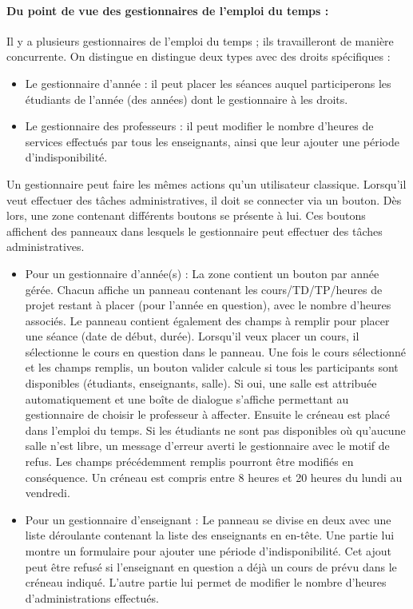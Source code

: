 \documentclass{article}
\begin{document}
\paragraph{Du point de vue des gestionnaires de l'emploi du temps :\\}
Il y a plusieurs gestionnaires de l'emploi du temps ; ils travailleront de manière concurrente. On distingue en distingue deux types avec des droits spécifiques :
\begin{itemize}
\item Le gestionnaire d'année : il peut placer les séances auquel participerons les étudiants de l'année (des années) dont le gestionnaire à les droits.
\item Le gestionnaire des professeurs : il peut modifier le nombre d'heures de services effectués par tous les enseignants, ainsi que leur ajouter une période d'indisponibilité.
\end{itemize}

Un gestionnaire peut faire les mêmes actions qu'un utilisateur classique. Lorsqu'il veut effectuer des tâches administratives, il doit se connecter via un bouton. Dès lors, une zone contenant différents boutons se présente à lui. Ces boutons affichent des panneaux dans lesquels le gestionnaire peut effectuer des tâches administratives.

\begin{itemize}
\item Pour un gestionnaire d'année(s) :
La zone contient un bouton par année gérée. Chacun affiche un panneau contenant les cours/TD/TP/heures de projet restant à placer (pour l'année en question), avec le nombre d'heures associés. Le panneau contient également des champs à remplir pour placer une séance (date de début, durée). Lorsqu'il veux placer un cours, il sélectionne le cours en question dans le panneau. Une fois le cours sélectionné et les champs remplis, un bouton valider calcule si tous les participants sont disponibles (étudiants, enseignants, salle). Si oui, une salle est attribuée automatiquement et une boîte de dialogue s'affiche permettant au gestionnaire de choisir le professeur à affecter. Ensuite le créneau est placé dans l'emploi du temps. Si les étudiants ne sont pas disponibles où qu'aucune salle n'est libre, un message d'erreur averti le gestionnaire avec le motif de refus. Les champs précédemment remplis pourront être modifiés en conséquence.
Un créneau est compris entre 8 heures et 20 heures du lundi au vendredi.\\

\item Pour un gestionnaire d'enseignant :
Le panneau se divise en deux avec une liste déroulante contenant la liste des enseignants en en-tête.
Une partie lui montre un formulaire pour ajouter une période d'indisponibilité. Cet ajout peut être refusé si l'enseignant en question a déjà un cours de prévu dans le créneau indiqué.
L'autre partie lui permet de modifier le nombre d'heures d'administrations effectués.
\end{itemize}
\end{document}

